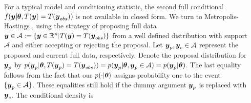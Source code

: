 \documentclass[ba]{imsart}
\def\bth{\mbox{\boldmath $\theta$}}
\def\bbeta{\mbox{\boldmath $\beta$}}
\newcommand{\by}{\mbox{\boldmath $y$}}
\newcommand{\mc}{\mathcal}
\newcommand{\blue}[1]{{\color{blue}#1}}
\begin{document}
For a typical model and conditioning statistic, the second full conditional $f(\by|\bth, T(\by)=T(\by_{obs}))$ %
is not available in closed form.  We turn to Metropolis-Hastings \citep{hastings1970},
using the strategy of proposing full data $\by \in \mathcal{A}:=\{\by \in \mathbb{R}^n | T(\by)=T(\by_{obs})\}$ from a well defined distribution with support $\mathcal{A}$ and either accepting or rejecting the
proposal. Let $\by_p, \by_c \in \mathcal{A}$ represent the proposed and current
full data, respectively. Denote the proposal distribution for $\by_{p}$ by $p(\by_p|\bth,T(\by_p) = T(\by_{obs})) = p(\by_p|\bth,\by_p \in \mathcal{A}) = p(\by_p | \bth)$.  The last equality follows from the fact that our $p(\cdot | \bth)$ assigns probability one to the event $\{ \by_p \in \mathcal{A} \}$.  These equalities still hold if the dummy argument $\by_p$ is replaced with $\by_c$.  The conditional density is
\end{document}
